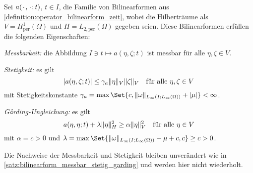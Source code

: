 \begin{Lemma}
\label{lemma:bilinearform_periodisch_messbar_stetig_garding}
    Sei $a({\mkern2mu\cdot\mkern2mu}, {\mkern2mu\cdot\mkern2mu}; t)$, $t \in I$, die Familie von Bilinearformen aus \cref{definition:operator_bilinearform_zeit}, wobei die Hilberträume als $V = H^{1}_{\text{per}}(\Omega)$ und $H = L_{2,\text{per}}(\Omega)$ gegeben seien.
    Diese Bilinearformen erfüllen die folgenden Eigenschaften:
    \begin{thmenumerate}
        \item \label{lemma:bilinearform_periodisch_messbar_stetig_garding:messbar}
        \emph{Messbarkeit:} die Abbildung $I \ni t \mapsto a(\eta, \zeta; t)$ ist messbar für alle $\eta, \zeta \in V$.
        \item\label{lemma:bilinearform_periodisch_messbar_stetig_garding:stetig}
        \emph{Stetigkeit:} es gilt
        \begin{equation}
            \label{eq:bilinearform_periodisch_messbar_stetig_garding:stetig}
            \lvert a(\eta, \zeta; t)\rvert \leq \gamma_{a} \lVert\eta\rVert_{V} \lVert\zeta\rVert_{V} \quad \text{für alle}~\eta, \zeta \in V
        \end{equation}
        mit Stetigkeitskonstante $\gamma_{a} = \max\Set{c, \norm{\omega}_{L_{\infty}(I; L_{\infty}(\Omega))} + \abs{\mu}} < \infty$.
        \item\label{lemma:bilinearform_periodisch_messbar_stetig_garding:garding}
        \emph{G\aa{}rding-Ungleichung:} es gilt
        \begin{equation}
            \label{eq:bilinearform_periodisch_messbar_stetig_garding:garding}
            a(\eta, \eta; t) + \lambda \lVert\eta\rVert_{H}^{2} \geq \alpha \lVert\eta\rVert_{V}^{2} \quad \text{für alle}~\eta \in V
        \end{equation}
        mit $\alpha = c > 0$ und $\lambda = \max\Set{\norm{\omega}_{L_{\infty}(I;L_{\infty}(\Omega))} - \mu + c, c} \geq c > 0$.
    \end{thmenumerate}

    \begin{Beweis}
        Die Nachweise der Messbarkeit und Stetigkeit bleiben unverändert wie in \cref{satz:bilinearform_messbar_stetig_garding} und werden hier nicht wiederholt.


\end{Beweis}
\end{Lemma}
